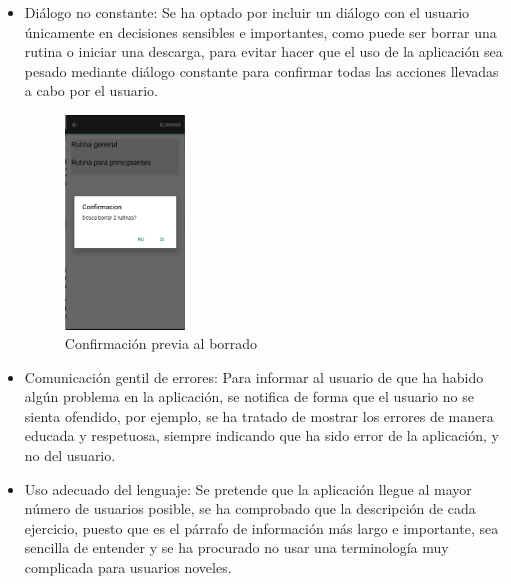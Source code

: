 \documentclass[11pt,a4paper]{report}
\begin{document}
\begin{itemize}
	\item Diálogo no constante: Se ha optado por incluir un diálogo con el usuario únicamente en decisiones sensibles e importantes, como puede ser borrar una rutina o iniciar una descarga, para evitar hacer que el uso de la aplicación sea pesado mediante diálogo constante para confirmar todas las acciones llevadas a cabo por el usuario.
	\begin{figure}[H]
		\centering
		\includegraphics[width=0.3\textwidth]{graficos/Usabilidad/dialogo.png}
		\caption{Confirmación previa al borrado}
	\end{figure}
	\item Comunicación gentil de errores: Para informar al usuario de que ha habido algún problema en la aplicación, se notifica de forma que el usuario no se sienta ofendido, por ejemplo, se ha tratado de mostrar los errores de manera educada y respetuosa, siempre indicando que ha sido error de la aplicación, y no del usuario.

	\item Uso adecuado del lenguaje: Se pretende que la aplicación llegue al mayor número de usuarios posible, se ha comprobado que la descripción de cada ejercicio, puesto que es el párrafo de información más largo e importante, sea sencilla de entender y se ha procurado no usar una terminología muy complicada para usuarios noveles.


\end{itemize}
\end{document}
